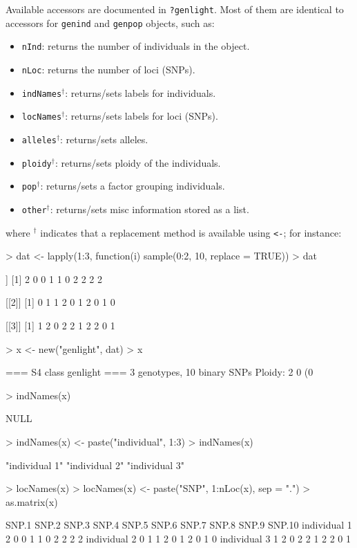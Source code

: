 \documentclass{article}
\newcommand{\code}[1]{{{\tt #1}}}
\begin{document}
Available accessors are documented in \code{?genlight}.
Most of them are identical to accessors for \texttt{genind} and \texttt{genpop} objects, such as:
\begin{itemize}
  \item \texttt{nInd}: returns the number of individuals in the object.
  \item \texttt{nLoc}: returns the number of loci (SNPs).
  \item \texttt{indNames}$^{\dagger}$: returns/sets labels for individuals.
  \item \texttt{locNames}$^{\dagger}$: returns/sets labels for loci (SNPs).
  \item \texttt{alleles}$^{\dagger}$: returns/sets alleles.
  \item \texttt{ploidy}$^{\dagger}$: returns/sets ploidy of the individuals.
  \item \texttt{pop}$^{\dagger}$: returns/sets a factor grouping individuals.
  \item \texttt{other}$^{\dagger}$: returns/sets misc information stored as a list.
\end{itemize}
where $^{\dagger}$ indicates that a replacement method is available using \texttt{<-}; for instance:
\begin{Schunk}
\begin{Sinput}
> dat <- lapply(1:3, function(i) sample(0:2, 10, replace = TRUE))
> dat
\end{Sinput}
\begin{Soutput}
[[1]]
 [1] 2 0 0 1 1 0 2 2 2 2

[[2]]
 [1] 0 1 1 2 0 1 2 0 1 0

[[3]]
 [1] 1 2 0 2 2 1 2 2 0 1
\end{Soutput}
\begin{Sinput}
> x <- new("genlight", dat)
> x
\end{Sinput}
\begin{Soutput}
 === S4 class genlight ===
 3 genotypes,  10 binary SNPs
 Ploidy: 2
 0 (0 %
\end{Soutput}
\begin{Sinput}
> indNames(x)
\end{Sinput}
\begin{Soutput}
NULL
\end{Soutput}
\begin{Sinput}
> indNames(x) <- paste("individual", 1:3)
> indNames(x)
\end{Sinput}
\begin{Soutput}
[1] "individual 1" "individual 2" "individual 3"
\end{Soutput}
\begin{Sinput}
> locNames(x)
> locNames(x) <- paste("SNP", 1:nLoc(x), sep = ".")
> as.matrix(x)
\end{Sinput}
\begin{Soutput}
             SNP.1 SNP.2 SNP.3 SNP.4 SNP.5 SNP.6 SNP.7 SNP.8 SNP.9 SNP.10
individual 1     2     0     0     1     1     0     2     2     2      2
individual 2     0     1     1     2     0     1     2     0     1      0
individual 3     1     2     0     2     2     1     2     2     0      1
\end{Soutput}
\end{Schunk}
\end{document}
